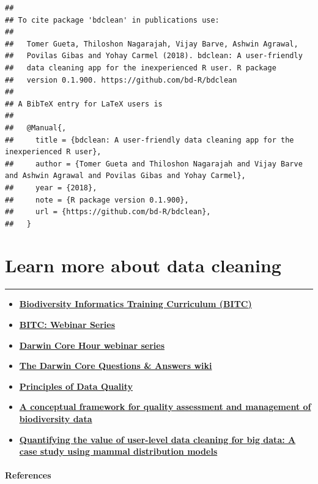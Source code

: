 \documentclass[]{book}
\begin{document}
\begin{verbatim}
## 
## To cite package 'bdclean' in publications use:
## 
##   Tomer Gueta, Thiloshon Nagarajah, Vijay Barve, Ashwin Agrawal,
##   Povilas Gibas and Yohay Carmel (2018). bdclean: A user-friendly
##   data cleaning app for the inexperienced R user. R package
##   version 0.1.900. https://github.com/bd-R/bdclean
## 
## A BibTeX entry for LaTeX users is
## 
##   @Manual{,
##     title = {bdclean: A user-friendly data cleaning app for the inexperienced R user},
##     author = {Tomer Gueta and Thiloshon Nagarajah and Vijay Barve and Ashwin Agrawal and Povilas Gibas and Yohay Carmel},
##     year = {2018},
##     note = {R package version 0.1.900},
##     url = {https://github.com/bd-R/bdclean},
##   }
\end{verbatim}

\chapter{Learn more about data
cleaning}\label{learn-more-about-data-cleaning}

\begin{center}\rule{0.5\linewidth}{\linethickness}\end{center}

\begin{itemize}
\item
  \textbf{\href{http://biodiversity-informatics-training.org/\%20target=\%22_blank\%22}{Biodiversity
  Informatics Training Curriculum (BITC)}}
\item
  \textbf{\href{http://biodiversity-informatics-training.org/webinar-series/\%20target=\%22_blank\%22}{BITC:
  Webinar Series}}
\item
  \textbf{\href{https://github.com/tdwg/dwc-qa/wiki/Webinars\%20target=\%22_blank\%22}{Darwin
  Core Hour webinar series}}
\item
  \textbf{\href{https://github.com/tdwg/dwc-qa/wiki\%20target=\%22_blank\%22}{The
  Darwin Core Questions \& Answers wiki}}
\item
  \textbf{\href{https://www.gbif.org/document/80509/principles-of-data-quality\%20target=\%22_blank\%22}{Principles
  of Data Quality} \citep{Chapman2005} }
\item
  \textbf{\href{https://journals.plos.org/plosone/article?id=10.1371/journal.pone.0178731\%20target=\%22_blank\%22}{A
  conceptual framework for quality assessment and management of
  biodiversity data} \citep{Veiga2017} }
\item
  \textbf{\href{http://dx.doi.org/10.1016/j.ecoinf.2016.06.001\%20target=\%22_blank\%22}{Quantifying
  the value of user-level data cleaning for big data: A case study using
  mammal distribution models} \citep{Gueta2016} }
\end{itemize}

\subsubsection*{References}\label{references}


\end{document}
